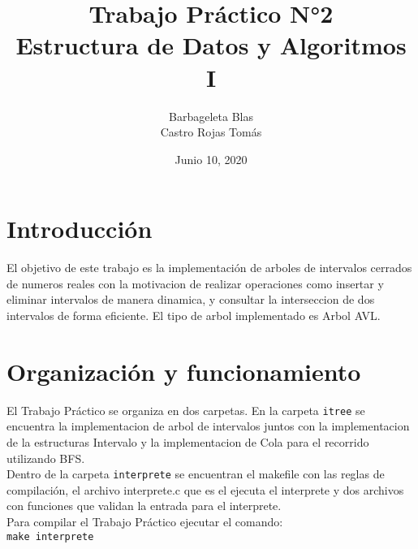 \documentclass{article}
\begin{document}
	\title{Trabajo Práctico N°2 \\ \large Estructura de Datos y Algoritmos I}
	\author{Barbageleta Blas \\ Castro Rojas Tomás}
	\date {Junio 10, 2020}
	\maketitle
	\newpage
	\section{Introducción}
	El objetivo de este trabajo es la implementación de arboles de intervalos cerrados de numeros reales con la motivacion de realizar operaciones como insertar y eliminar intervalos de manera dinamica, y consultar la interseccion de dos intervalos de forma eficiente. El tipo de arbol implementado es Arbol AVL.
	\section{Organización y funcionamiento}
	El Trabajo Práctico se organiza en dos carpetas. En la carpeta \verb|itree| se encuentra la implementacion de arbol de intervalos juntos con la implementacion de la estructuras Intervalo y la implementacion de Cola para el recorrido utilizando BFS.
	\\Dentro de la carpeta \verb|interprete| se encuentran el makefile con las reglas de compilación, el archivo interprete.c que es el ejecuta el interprete y dos archivos con funciones que validan la entrada para el interprete.
	\\Para compilar el Trabajo Práctico ejecutar el comando: \\
	\verb|make interprete|\\
\end{document}
